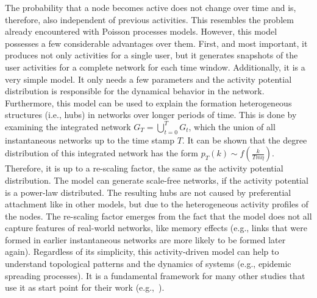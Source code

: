 The probability that a node becomes active does not change over time and is, therefore, also independent of previous activities.
This resembles the problem already encountered with Poisson processes models.
However, this model possesses a few considerable advantages over them.
First, and most important, it produces not only activities for a single user, but it generates snapshots of the user activities for a complete network for each time window.
Additionally, it is a very simple model.
It only needs a few parameters and the activity potential distribution is responsible for the dynamical behavior in the network.
Furthermore, this model can be used to explain the formation heterogeneous structures (i.e., hubs) in networks over longer periods of time.
This is done by examining the integrated network \(G_{T} = \bigcup_{t=0}^{T} G_{t}\), which the union of all instantaneous networks up to the time stamp \(T\).
It can be shown that the  degree distribution of this integrated network has the form \(p_{T}(k) \sim f(\frac{k}{T m \eta})\).
Therefore, it is up to a re-scaling factor, the same as the activity potential distribution.
The model can generate scale-free networks, if the activity potential is a power-law distributed.
The resulting hubs are not caused by preferential attachment like in other models, but due to the heterogeneous activity profiles of the nodes.
The re-scaling factor emerges from the fact that the model does not all capture features of real-world networks, like memory effects (e.g., links that were formed in earlier instantaneous networks are more likely to be formed later again).
Regardless of its simplicity, this activity-driven model can help to understand topological patterns and the dynamics of systems (e.g., epidemic spreading processes).
It is a fundamental framework for many other studies that use it as start point for their work (e.g.,~\cite{Perra2012b, Liu2013, Rizzo2016}).
